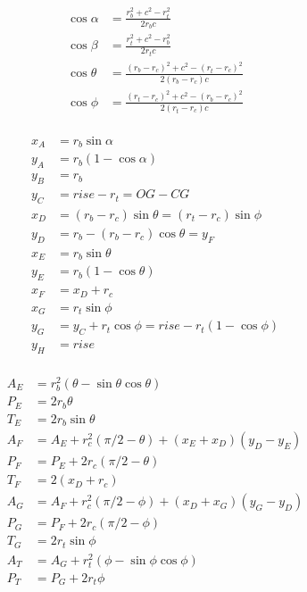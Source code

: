 \begin{equation}
\begin{aligned}
\cos\alpha &= \frac{r_b^2 + c^2 - r_t^2}{2r_b c} \\%
\cos\beta &= \frac{r_t^2 + c^2 - r_b^2}{2r_t c} \\ %
\cos\theta &= \frac{(r_b - r_c)^2 + c^2 - (r_t - r_c)^2}{2(r_b - r_c) c} \\ %
\cos\phi &= \frac{(r_t - r_c)^2 + c^2 - (r_b - r_c)^2}{2(r_t - r_c) c}  \\%
\end{aligned}
\end{equation}

\begin{equation}
\begin{aligned}
x_A & = r_b  \sin\alpha \\
y_A & = r_b  (1 - \cos\alpha) \\
y_B & = r_b \\
y_C & = rise - r_t = OG - CG \\
x_D &= (r_b -  r_c ) \sin\theta = (r_t - r_c) \sin \phi\\
y_D &= r_b - (r_b -  r_c ) \cos\theta = y_F \\
x_E & = r_b  \sin\theta \\
y_E & = r_b (1 - \cos\theta)\\
x_F & = x_D + r_c \\
x_G &= r_t \sin\phi \\
y_G &= y_C + r_t \cos\phi = rise - r_t (1 - \cos\phi) \\
y_H & = rise \\
\end{aligned}
\end{equation}

\begin{equation}
\begin{aligned}
A_E & =r_b^2(\theta - \sin \theta \cos \theta)  \\
P_E & =2  r_b \theta \\
T_E & = 2 r_b \sin \theta  \\
A_F & = A_E +   r_c^2 (\pi/2 - \theta) +  (x_E + x_D)(y_D-y_E)  \\
P_F & = P_E + 2  r_c (\pi/2 - \theta) \\
T_F & =  2 (x_D + r_c)  \\
A_G & = A_F +   r_c^2 (\pi/2 - \phi) +  (x_D + x_G)(y_G-y_D)   \\
P_G & = P_F + 2  r_c (\pi/2 - \phi) \\
T_G & =  2 r_t \sin \phi  \\
A_T & = A_G + r_t^2(\phi - \sin\phi\cos\phi) \\
P_T &= P_G + 2 r_t\phi
\end{aligned}
\end{equation}

